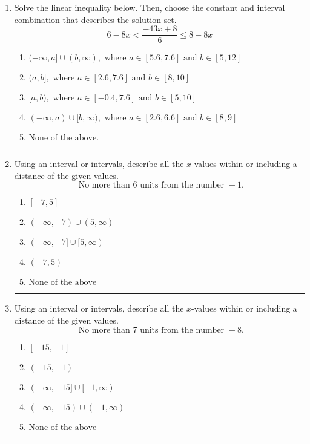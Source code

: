 \documentclass[14pt]{extbook}
\newcommand{\litem}[1]{\item#1\hspace*{-1cm}\rule{\textwidth}{0.4pt}}
\begin{document}
\begin{enumerate}
{\begin{enumerate}[label=\Alph*.]
\end{enumerate} }
\litem{
Solve the linear inequality below. Then, choose the constant and interval combination that describes the solution set.\[ 6 - 8 x < \frac{-43 x + 8}{6} \leq 8 - 8 x \]\begin{enumerate}[label=\Alph*.]
\item \( (-\infty, a] \cup (b, \infty), \text{ where } a \in [5.6, 7.6] \text{ and } b \in [5, 12] \)
\item \( (a, b], \text{ where } a \in [2.6, 7.6] \text{ and } b \in [8, 10] \)
\item \( [a, b), \text{ where } a \in [-0.4, 7.6] \text{ and } b \in [5, 10] \)
\item \( (-\infty, a) \cup [b, \infty), \text{ where } a \in [2.6, 6.6] \text{ and } b \in [8, 9] \)
\item \( \text{None of the above.} \)

\end{enumerate} }
\litem{
Using an interval or intervals, describe all the $x$-values within or including a distance of the given values.\[ \text{ No more than } 6 \text{ units from the number } -1. \]\begin{enumerate}[label=\Alph*.]
\item \( [-7, 5] \)
\item \( (-\infty, -7) \cup (5, \infty) \)
\item \( (-\infty, -7] \cup [5, \infty) \)
\item \( (-7, 5) \)
\item \( \text{None of the above} \)

\end{enumerate} }
\litem{
Using an interval or intervals, describe all the $x$-values within or including a distance of the given values.\[ \text{ No more than } 7 \text{ units from the number } -8. \]\begin{enumerate}[label=\Alph*.]
\item \( [-15, -1] \)
\item \( (-15, -1) \)
\item \( (-\infty, -15] \cup [-1, \infty) \)
\item \( (-\infty, -15) \cup (-1, \infty) \)
\item \( \text{None of the above} \)


\end{enumerate}}
\end{enumerate}
\end{document}
